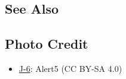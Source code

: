 \begin{adclist}
\end{adclist}

\subsection{See Also}
\begin{typelist}
\end{typelist}

\subsection{Photo Credit}
\begin{itemize}\raggedright
    \item \href{https://commons.wikimedia.org/wiki/File:Shenyang_J-6_(cropped).jpg}{J-6}: Alert5 (CC BY-SA 4.0)
\end{itemize}

